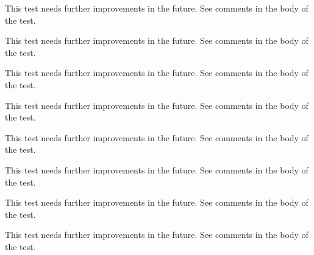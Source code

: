 \begin{DoxyRefList}
%
 This test needs further improvements in the future. See comments in the body of the test.  
\item[Subprogram \mbox{\hyperlink{namespaceTest__System__mod_ab0121f340538dae91c97cc5cdcba0a7b}{Test\+\_\+\+System\+\_\+mod\+::test\+\_\+\+Env\+Var\+\_\+type\+\_\+2}} ()]\label{todo__todo000032}%
%
 This test needs further improvements in the future. See comments in the body of the test.  
\item[Subprogram \mbox{\hyperlink{namespaceTest__System__mod_a26054fb4e3bf2d05710adc7965bc8431}{Test\+\_\+\+System\+\_\+mod\+::test\+\_\+\+Env\+Var\+\_\+type\+\_\+3}} ()]\label{todo__todo000033}%
%
 This test needs further improvements in the future. See comments in the body of the test.  
\item[Subprogram \mbox{\hyperlink{namespaceTest__System__mod_a8d37f80583c104a3dfb6b99a897feb26}{Test\+\_\+\+System\+\_\+mod\+::test\+\_\+execute\+Cmd\+\_\+1}} ()]\label{todo__todo000039}%
%
 This test needs further improvements in the future. See comments in the body of the test.  
\item[Subprogram \mbox{\hyperlink{namespaceTest__System__mod_a733db17082cd5058dbc8d19e6f620909}{Test\+\_\+\+System\+\_\+mod\+::test\+\_\+execute\+Cmd\+\_\+2}} ()]\label{todo__todo000040}%
%
 This test needs further improvements in the future. See comments in the body of the test.  
\item[Subprogram \mbox{\hyperlink{namespaceTest__System__mod_a9a276bf5a7b9db66c140bd2202ebc7e9}{Test\+\_\+\+System\+\_\+mod\+::test\+\_\+get\+System\+Info\+\_\+1}} ()]\label{todo__todo000041}%
%
 This test needs further improvements in the future. See comments in the body of the test.  
\item[Subprogram \mbox{\hyperlink{namespaceTest__System__mod_aabfd080659733c4a852c62ccd400599b}{Test\+\_\+\+System\+\_\+mod\+::test\+\_\+\+OS\+\_\+type\+\_\+1}} ()]\label{todo__todo000035}%
%
 This test needs further improvements in the future. See comments in the body of the test.  
\item[Subprogram \mbox{\hyperlink{namespaceTest__System__mod_a86976d55b3a779d9a8c0064155e9cd4a}{Test\+\_\+\+System\+\_\+mod\+::test\+\_\+\+OS\+\_\+type\+\_\+2}} ()]\label{todo__todo000036}%
%
 This test needs further improvements in the future. See comments in the body of the test.  

\end{DoxyRefList}
